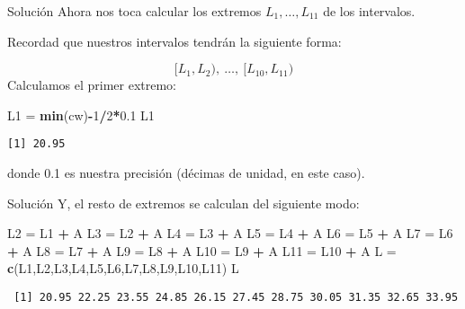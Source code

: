 \documentclass[
  ignorenonframetext,
]{beamer}
\newenvironment{Shaded}{\begin{snugshade}}{\end{snugshade}}
\newcommand{\DecValTok}[1]{\textcolor[rgb]{0.00,0.00,0.81}{#1}}
\newcommand{\FloatTok}[1]{\textcolor[rgb]{0.00,0.00,0.81}{#1}}
\newcommand{\KeywordTok}[1]{\textcolor[rgb]{0.13,0.29,0.53}{\textbf{#1}}}
\newcommand{\NormalTok}[1]{#1}
\newcommand{\OperatorTok}[1]{\textcolor[rgb]{0.81,0.36,0.00}{\textbf{#1}}}
\newcommand{\StringTok}[1]{\textcolor[rgb]{0.31,0.60,0.02}{#1}}
\begin{document}
\begin{frame}[fragile]{Solución}
\protect\hypertarget{soluciuxf3n-5}{}
Ahora nos toca calcular los extremos \(L_1,\dots,L_{11}\) de los
intervalos.

Recordad que nuestros intervalos tendrán la siguiente forma:

\[[L_1,L_2),\ \dots,\ [L_{10},L_{11})\] Calculamos el primer extremo:

\begin{Shaded}
\begin{Highlighting}[]
\NormalTok{L1 =}\StringTok{ }\KeywordTok{min}\NormalTok{(cw)}\OperatorTok{{-}}\DecValTok{1}\OperatorTok{/}\DecValTok{2}\OperatorTok{*}\FloatTok{0.1}
\NormalTok{L1}
\end{Highlighting}
\end{Shaded}

\begin{verbatim}
[1] 20.95
\end{verbatim}

donde 0.1 es nuestra precisión (décimas de unidad, en este caso).
\end{frame}

\begin{frame}[fragile]{Solución}
\protect\hypertarget{soluciuxf3n-6}{}
Y, el resto de extremos se calculan del siguiente modo:

\begin{Shaded}
\begin{Highlighting}[]
\NormalTok{L2 =}\StringTok{ }\NormalTok{L1 }\OperatorTok{+}\StringTok{ }\NormalTok{A}
\NormalTok{L3 =}\StringTok{ }\NormalTok{L2 }\OperatorTok{+}\StringTok{ }\NormalTok{A}
\NormalTok{L4 =}\StringTok{ }\NormalTok{L3 }\OperatorTok{+}\StringTok{ }\NormalTok{A}
\NormalTok{L5 =}\StringTok{ }\NormalTok{L4 }\OperatorTok{+}\StringTok{ }\NormalTok{A}
\NormalTok{L6 =}\StringTok{ }\NormalTok{L5 }\OperatorTok{+}\StringTok{ }\NormalTok{A}
\NormalTok{L7 =}\StringTok{ }\NormalTok{L6 }\OperatorTok{+}\StringTok{ }\NormalTok{A}
\NormalTok{L8 =}\StringTok{ }\NormalTok{L7 }\OperatorTok{+}\StringTok{ }\NormalTok{A}
\NormalTok{L9 =}\StringTok{ }\NormalTok{L8 }\OperatorTok{+}\StringTok{ }\NormalTok{A}
\NormalTok{L10 =}\StringTok{ }\NormalTok{L9 }\OperatorTok{+}\StringTok{ }\NormalTok{A}
\NormalTok{L11 =}\StringTok{ }\NormalTok{L10 }\OperatorTok{+}\StringTok{ }\NormalTok{A}
\NormalTok{L =}\StringTok{ }\KeywordTok{c}\NormalTok{(L1,L2,L3,L4,L5,L6,L7,L8,L9,L10,L11)}
\NormalTok{L}
\end{Highlighting}
\end{Shaded}

\begin{verbatim}
 [1] 20.95 22.25 23.55 24.85 26.15 27.45 28.75 30.05 31.35 32.65 33.95
\end{verbatim}
\end{frame}
\end{document}
